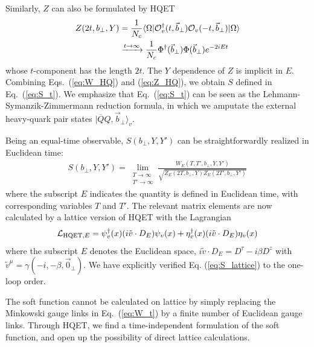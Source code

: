 \documentclass[twocolumn,aps,preprintnumbers,prd,superscriptaddress,10pt]{revtex4-1}
\begin{document}
Similarly, $Z$ can also be formulated by HQET
\begin{align}\label{eq:Z_HQ}
Z(2t,b_\perp,Y)&=\frac{1}{N_c}\langle\Omega|{\cal O}^\dagger_v(t,{\vec b}_\perp){\cal O}_v(-t,\vec{b}_\perp)|\Omega\rangle \nonumber\\
&\xrightarrow[]{\substack{t\to\infty}}\frac{1}{N_c}\Phi^\dagger({\vec b}_\perp )\Phi({\vec b}_\perp)e^{-2iEt}
\end{align}
whose $t$-component has the length $2t$.
%
The $Y$ dependence of $Z$ is implicit in $E$.
%
Combining Eqs.~(\ref{eq:W_HQ}) and (\ref{eq:Z_HQ}), we obtain $S$ defined in Eq.~(\ref{eq:S_t}). We emphasize that Eq.~(\ref{eq:S_t}) can be seen as the Lehmann-Symanzik-Zimmermann reduction formula, in which we amputate the external heavy-quark pair states $|\overline QQ,{\vec b}_\perp\rangle_v$.


Being an equal-time observable, $S(b_\perp,Y,Y')$ can be straightforwardly realized in Euclidean time:
\begin{align}\label{eq:S_lattice}
S(b_\perp,Y,Y')=\lim_{\substack{T\to\infty\\T'\to\infty}}\frac{W_E(T,T',b_\perp,Y,Y')}{\sqrt{Z_E(2T,b_\perp,Y)Z_E(2T',b_\perp,Y')}}
\end{align}
where the subscript $E$ indicates the quantity is defined in Euclidean time, with corresponding
variables $T$ and $T'$.
%
The relevant matrix elements are now calculated by a lattice version of HQET with the Lagrangian~\cite{Aglietti:1993hf,Hashimoto:1995in,Horgan:2009ti}
\begin{align}
{\cal L}_{{\rm HQET},E}=\psi_v^\dagger(x) (i\tilde v\cdot D_E)\psi_v(x)+\eta_v^\dagger(x) (i\tilde v\cdot D_E)\eta_v(x)
\end{align}
where the subscript $E$ denotes the Euclidean space, $i\tilde v\cdot D_E=D^\tau-i\beta D^z$ with $\tilde v^\mu=\gamma(-i,-\beta,\vec 0_\perp)$. We have explicitly verified Eq. (\ref{eq:S_lattice}) to the one-loop order.

The soft function cannot be calculated on lattice by simply replacing the Minkowski gauge links in Eq.~(\ref{eq:W_t}) by a finite number of Euclidean gauge links. Through HQET, we find a time-independent formulation of the soft function, and open up the possibility of direct lattice calculations.\\
\end{document}
